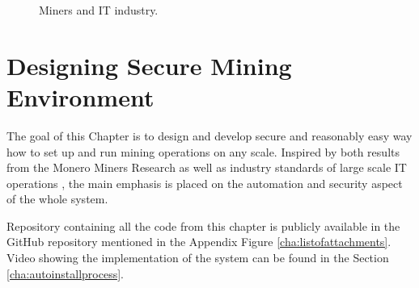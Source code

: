 \documentclass[
  printed, %
  table,   %
  lof,     %
  lot,     %
           oneside, color
]{fithesis3}
\begin{document}
\begin{center}
\begin{figure}[H]
\caption{Miners and IT industry.}
\label{chart:itindustryuserresearch}\end{figure}\end{center}

\chapter{Designing Secure Mining Environment}
The goal of this Chapter is to design and develop secure and reasonably easy way how to set up and run mining operations on any scale. Inspired by both results from the Monero Miners Research as well as industry standards of large scale IT operations , the main emphasis is placed on the automation and security aspect of the whole system. 

Repository containing all the code from this chapter is publicly available in the GitHub repository mentioned in the Appendix Figure \ref{cha:listofattachments}. Video showing the implementation of the system can be found in the Section \ref{cha:autoinstallprocess}.
\end{document}
